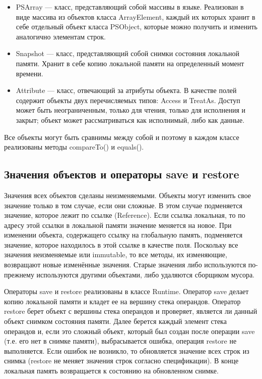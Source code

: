 \begin{itemize}
\item PSArray ---  класс, представляющий собой массивы в языке. Реализован в виде массива из объектов класса ArrayElement, каждый их которых хранит в себе отдельный объект класса PSObject, которые можно получить и изменить аналогично элементам строк.
\item Snapshot ---  класс, представляющий собой снимки состояния локальной памяти. Хранит в себе копию локальной памяти на определенный момент времени.
\item Attribute --- класс, отвечающий за атрибуты объекта. В качестве полей содержит объекты двух перечисляемых типов: Access и TreatAs. Доступ может быть неограниченным, только для чтения, только для исполнения и закрыт; объект может рассматриваться как исполнимый, либо как данные.
\end{itemize}

Все объекты могут быть сравнимы между собой и поэтому в каждом классе реализованы методы compareTo() и equals().

\subsection{Значения объектов и операторы save и restore}

Значения всех объектов сделаны неизменяемыми. Объекты могут изменить свое значение только в том случае, если они сложные. В этом случае  подменяется значение, которое лежит по ссылке (Reference). Если ссылка локальная, то по адресу этой ссылки в локальной памяти значение меняется на новое. При изменении объекта, содержащего ссылку на глобальную память, подменяется значение, которое находилось в этой ссылке в качестве поля. Поскольку все значения неизменяемые или immutable, то все методы, их изменяющие, возвращают новые изменённые значения. Старые значения либо используются по-прежнему используются другими объектами, либо удаляются сборщиком мусора.

Операторы save и restore реализованы в классе Runtime. Оператор save делает копию локальной памяти и кладет ее на вершину стека операндов. Оператор restore берет объект с вершины стека операндов и проверяет, является ли данный объект снимком состояния памяти. Далее берется каждый элемент стека операндов и, если это сложный объект, который был создан после операции save (т.е. его нет в снимке памяти), выбрасывается ошибка, операция restore не выполняется. Если ошибок не возникло, то обновляется значение всех строк из снимка (restore не меняет значения строк согласно спецификации). В конце локальная память возвращается к состоянию на обновленном снимке. 

